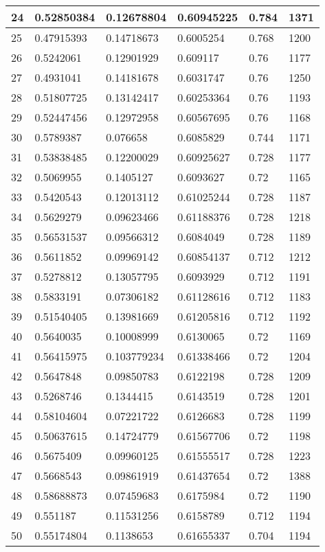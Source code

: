 \begin{longtable}{|l|l|l|l|l|l|}
24 & 0.52850384 & 0.12678804 & 0.60945225 & 0.784 & 1371 \\ \hline 
25 & 0.47915393 & 0.14718673 & 0.6005254 & 0.768 & 1200 \\ \hline 
26 & 0.5242061 & 0.12901929 & 0.609117 & 0.76 & 1177 \\ \hline 
27 & 0.4931041 & 0.14181678 & 0.6031747 & 0.76 & 1250 \\ \hline 
28 & 0.51807725 & 0.13142417 & 0.60253364 & 0.76 & 1193 \\ \hline 
29 & 0.52447456 & 0.12972958 & 0.60567695 & 0.76 & 1168 \\ \hline 
30 & 0.5789387 & 0.076658 & 0.6085829 & 0.744 & 1171 \\ \hline 
31 & 0.53838485 & 0.12200029 & 0.60925627 & 0.728 & 1177 \\ \hline 
32 & 0.5069955 & 0.1405127 & 0.6093627 & 0.72 & 1165 \\ \hline 
33 & 0.5420543 & 0.12013112 & 0.61025244 & 0.728 & 1187 \\ \hline 
34 & 0.5629279 & 0.09623466 & 0.61188376 & 0.728 & 1218 \\ \hline 
35 & 0.56531537 & 0.09566312 & 0.6084049 & 0.728 & 1189 \\ \hline 
36 & 0.5611852 & 0.09969142 & 0.60854137 & 0.712 & 1212 \\ \hline 
37 & 0.5278812 & 0.13057795 & 0.6093929 & 0.712 & 1191 \\ \hline 
38 & 0.5833191 & 0.07306182 & 0.61128616 & 0.712 & 1183 \\ \hline 
39 & 0.51540405 & 0.13981669 & 0.61205816 & 0.712 & 1192 \\ \hline 
40 & 0.5640035 & 0.10008999 & 0.6130065 & 0.72 & 1169 \\ \hline 
41 & 0.56415975 & 0.103779234 & 0.61338466 & 0.72 & 1204 \\ \hline 
42 & 0.5647848 & 0.09850783 & 0.6122198 & 0.728 & 1209 \\ \hline 
43 & 0.5268746 & 0.1344415 & 0.6143519 & 0.728 & 1201 \\ \hline 
44 & 0.58104604 & 0.07221722 & 0.6126683 & 0.728 & 1199 \\ \hline 
45 & 0.50637615 & 0.14724779 & 0.61567706 & 0.72 & 1198 \\ \hline 
46 & 0.5675409 & 0.09960125 & 0.61555517 & 0.728 & 1223 \\ \hline 
47 & 0.5668543 & 0.09861919 & 0.61437654 & 0.72 & 1388 \\ \hline 
48 & 0.58688873 & 0.07459683 & 0.6175984 & 0.72 & 1190 \\ \hline 
49 & 0.551187 & 0.11531256 & 0.6158789 & 0.712 & 1194 \\ \hline 
50 & 0.55174804 & 0.1138653 & 0.61655337 & 0.704 & 1194 \\ \hline 
\end{longtable}